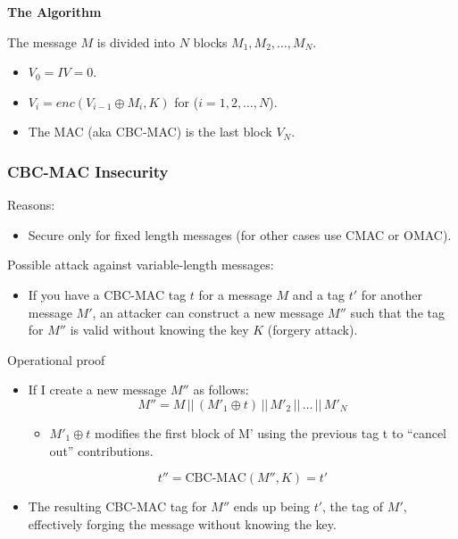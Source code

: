 \begin{center}
    \textbf{The Algorithm}
\end{center}
The message $M$ is divided into $N$ blocks $M_1, M_2, \dots, M_N$.
\begin{itemize}
    \item $V_0 = IV = 0$.
    \item $V_i = enc(V_{i-1} \oplus M_i, K)$ \quad \quad for ($i=1,2,\dots,N$).
    \item The MAC (aka CBC-MAC) is the last block $V_N$.
\end{itemize}

\subsubsection*{CBC-MAC Insecurity}
Reasons:
\begin{itemize}
    \item Secure only for fixed length messages (for other cases use CMAC or OMAC).
\end{itemize}
Possible attack against variable-length messages:
    \begin{itemize}
        \item If you have a CBC-MAC tag $t$ for a message $M$ and a tag $t'$ for another message $M'$, an attacker can construct a new message $M''$ such that the tag for $M''$ is valid without knowing the key $K$ (forgery attack).
        
\end{itemize}
\begin{center}
    Operational proof
\end{center}
    \begin{itemize}
        \item If I create a new message $M''$ as follows:
        \[
            M'' = M \, || \, (M'_1 \oplus t) \, || \, M'_2 \, || \, \dots \, || \, M'_N
        \]
        \begin{itemize}
            \item $M'_1 \oplus t$ modifies the first block of M' using the previous tag t to “cancel out” contributions.
        \end{itemize} 
        \[
            t'' = \text{CBC-MAC}(M'', K) = t'
        \]
        \item The resulting CBC-MAC tag for $M''$ ends up being $t'$, the tag of $M'$, effectively forging the message without knowing the key.
    \end{itemize}

